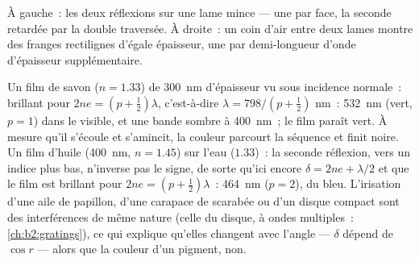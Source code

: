 \begin{omfigure}

{\small À gauche~: les deux réflexions sur une lame mince --- une par
face, la seconde retardée par la double traversée. À droite~: un coin d'air
entre deux lames montre des franges rectilignes d'égale épaisseur, une par
demi-longueur d'onde d'épaisseur supplémentaire.}
\end{omfigure}

\begin{example}\label{ex:b2:two-wave-interference:colours}
Un film de savon ($n = 1.33$) de \qty{300}{nm} d'épaisseur vu sous incidence normale~:
brillant pour $2ne = (p + \tfrac12)\lambda$, c'est-à-dire $\lambda = 798/(p + \tfrac12)$ nm~: \qty{532}{nm}
(vert, $p = 1$) dans le visible, et une bande sombre à \qty{400}{nm}~; le
film paraît vert. À mesure qu'il s'écoule et s'amincit, la couleur parcourt la
séquence et finit noire. Un film d'huile (\qty{400}{nm}, $n = 1.45$) sur l'eau
($1.33$)~: la seconde réflexion, vers un indice plus bas, n'inverse pas
le signe, de sorte qu'ici encore $\delta = 2ne + \lambda/2$ et que le film est brillant pour $2ne =
(p + \tfrac12)\lambda$~: \qty{464}{nm} ($p = 2$), du bleu. L'irisation d'une aile
de papillon, d'une carapace de scarabée ou d'un disque compact sont des interférences
de même nature (celle du disque, à ondes multiples~: \cref{ch:b2:gratings}),
ce qui explique qu'elles changent avec l'angle --- $\delta$ dépend de $\cos r$ ---
alors que la couleur d'un pigment, non.
\end{example}

